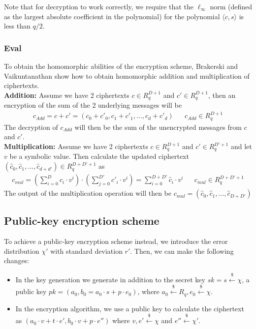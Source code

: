 \documentclass[../main.tex]{subfiles}
\newcommand{\getsrand}{\overset{\$}{\gets}}
\begin{document}
Note that for decryption to work correctly, we require that the $\ell_\infty$ norm (defined as the largest absolute coefficient in the polynomial) for the polynomial $\langle c, s \rangle$ is less than $q / 2$.

\subsubsection{Eval}
To obtain the homomorphic abilities of the encryption scheme, Brakerski and Vaikuntanathan show
how to obtain homomorphic addition and multiplication of ciphertexts.
\\[2mm]
\textbf{Addition:} Assume we have 2 ciphertexts $c \in R_q^{D+1}$ and $c' \in R_q^{D+1}$, then an encryption
of the sum of the 2 underlying messages will be
\begin{align*}
    c_{Add} = c + c' = (c_0 + c'_0, c_1 + c'_1, \dots , c_d + c'_d) &  & c_{Add} \in R_q^{D + 1}
\end{align*}
The decryption of $c_{Add}$ will then be the sum of the unencrypted messages from $c$ and $c'$.
\\[2mm]
\textbf{Multiplication:} Assume we have 2 ciphertexts $c \in R_q^{D+1}$ and $c' \in R_q^{D'+1}$ and let $v$ be a symbolic value.
Then calculate the updated ciphertext $(\hat{c}_0, \hat{c}_1, \dots, \hat{c}_{d+d'}) \in R_q^{D + D' + 1}$ as
\begin{align*}
    c_{mul} = (\sum_{i=0}^D c_i \cdot v^i) \cdot
    (\sum_{j=0}^{D'} c'_i \cdot v^i) =
    \sum_{i=0}^{D+D'} \hat{c}_i \cdot v^i
     &  & c_{mul} \in R_q^{D+D'+1}
\end{align*}
The output of the multiplication operation will then be $c_{mul} = (\hat{c}_0, \hat{c}_1, \dots, \hat{c}_{D+D'})$

\subsection{Public-key encryption scheme}
To achieve a public-key encryption scheme instead, we introduce the error distribution $\chi '$ with standard deviation $r'$.
Then, we can make the following changes:
\begin{itemize}
    \item In the key generation we generate in addition to the secret key $sk = s \getsrand{} \chi$, a public key
        $pk = (a_0 , b_0 = a_0 \cdot s + p \cdot e_0)$, where $a_0 \getsrand{} R_q, e_0 \getsrand{} \chi$.
    \item In the encryption algorithm, we use a public key to calculate the ciphertext as
        $(a_0 \cdot v + t \cdot e', b_0 \cdot v + p \cdot e'')$ where
        $v, e' \getsrand{} \chi$ and $e'' \getsrand{} \chi '$.
\end{itemize}
\end{document}
